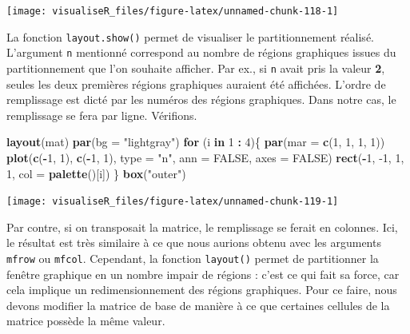 \documentclass[]{article}
\newenvironment{Shaded}{\begin{snugshade}}{\end{snugshade}}
\newcommand{\ControlFlowTok}[1]{\textcolor[rgb]{0.13,0.29,0.53}{\textbf{#1}}}
\newcommand{\DataTypeTok}[1]{\textcolor[rgb]{0.13,0.29,0.53}{#1}}
\newcommand{\DecValTok}[1]{\textcolor[rgb]{0.00,0.00,0.81}{#1}}
\newcommand{\KeywordTok}[1]{\textcolor[rgb]{0.13,0.29,0.53}{\textbf{#1}}}
\newcommand{\NormalTok}[1]{#1}
\newcommand{\OperatorTok}[1]{\textcolor[rgb]{0.81,0.36,0.00}{\textbf{#1}}}
\newcommand{\OtherTok}[1]{\textcolor[rgb]{0.56,0.35,0.01}{#1}}
\newcommand{\StringTok}[1]{\textcolor[rgb]{0.31,0.60,0.02}{#1}}
\begin{document}
\begin{center}\texttt{[image: visualiseR\_files/figure-latex/unnamed-chunk-118-1]} \end{center}

La fonction \texttt{layout.show()} permet de visualiser le partitionnement réalisé.
L'argument \texttt{n} mentionné correspond au nombre de régions graphiques issues du
partitionnement que l'on souhaite afficher. Par ex., si \texttt{n} avait pris la valeur
\textbf{2}, seules les deux premières régions graphiques auraient été affichées.
L'ordre de remplissage est dicté par les numéros des régions graphiques. Dans
notre cas, le remplissage se fera par ligne. Vérifions.

\begin{Shaded}
\begin{Highlighting}[]
\KeywordTok{layout}\NormalTok{(mat)}
\KeywordTok{par}\NormalTok{(}\DataTypeTok{bg =} \StringTok{"lightgray"}\NormalTok{)}
\ControlFlowTok{for}\NormalTok{ (i }\ControlFlowTok{in} \DecValTok{1} \OperatorTok{:}\StringTok{ }\DecValTok{4}\NormalTok{)\{}
\KeywordTok{par}\NormalTok{(}\DataTypeTok{mar =} \KeywordTok{c}\NormalTok{(}\DecValTok{1}\NormalTok{, }\DecValTok{1}\NormalTok{, }\DecValTok{1}\NormalTok{, }\DecValTok{1}\NormalTok{))}
\KeywordTok{plot}\NormalTok{(}\KeywordTok{c}\NormalTok{(}\OperatorTok{-}\DecValTok{1}\NormalTok{, }\DecValTok{1}\NormalTok{), }\KeywordTok{c}\NormalTok{(}\OperatorTok{-}\DecValTok{1}\NormalTok{, }\DecValTok{1}\NormalTok{), }\DataTypeTok{type =} \StringTok{"n"}\NormalTok{, }\DataTypeTok{ann =} \OtherTok{FALSE}\NormalTok{, }\DataTypeTok{axes =} \OtherTok{FALSE}\NormalTok{)}
\KeywordTok{rect}\NormalTok{(}\OperatorTok{-}\DecValTok{1}\NormalTok{, }\DecValTok{-1}\NormalTok{, }\DecValTok{1}\NormalTok{, }\DecValTok{1}\NormalTok{, }\DataTypeTok{col =} \KeywordTok{palette}\NormalTok{()[i])}
\NormalTok{\}}
\KeywordTok{box}\NormalTok{(}\StringTok{"outer"}\NormalTok{)}
\end{Highlighting}
\end{Shaded}

\begin{center}\texttt{[image: visualiseR\_files/figure-latex/unnamed-chunk-119-1]} \end{center}

Par contre, si on transposait la matrice, le remplissage se ferait en colonnes.
Ici, le résultat est très similaire à ce que nous aurions obtenu avec les
arguments \texttt{mfrow} ou \texttt{mfcol}. Cependant, la fonction \texttt{layout()} permet de
partitionner la fenêtre graphique en un nombre impair de régions : c'est ce qui
fait sa force, car cela implique un redimensionnement des régions graphiques.
Pour ce faire, nous devons modifier la matrice de base de manière à ce que
certaines cellules de la matrice possède la même valeur.
\end{document}
